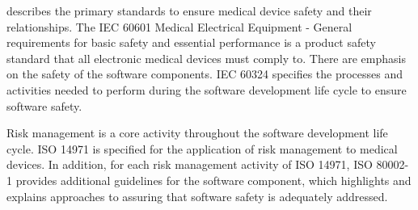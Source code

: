  describes the primary standards to ensure medical device safety and their relationships. The IEC 60601 Medical Electrical Equipment - General requirements for basic safety and essential performance is a product safety standard that all electronic medical devices must comply to. There are emphasis on the safety of the software components. IEC 60324 specifies the processes and activities needed to perform during the software development life cycle to ensure software safety. 

Risk management is a core activity throughout the software development life cycle. ISO 14971 is specified for the application of risk management to medical devices. In addition, for each risk management activity of ISO 14971, ISO 80002-1 provides additional guidelines for the software component, which highlights and explains approaches to assuring that software safety is adequately addressed.



